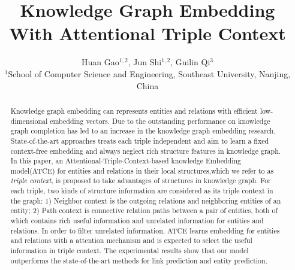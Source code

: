 \documentclass{article}
\title{Knowledge Graph Embedding With Attentional Triple Context}
\author{Huan Gao$^{1,2}$, Jun Shi$^{1,2}$, Guilin Qi$^{3}$\\
$^{1}$School of Computer Science and Engineering,
Southeast University, Nanjing, China  \\
}
\begin{document}
\maketitle

\begin{abstract}
    Knowledge graph embedding can represents entities and relations with efficient low-dimensional embedding vectors. Due to the outstanding performance on knowledge graph completion has led to an increase in the knowledge graph embedding research. State-of-the-art approaches treats each triple independent and aim to learn a fixed context-free embedding and always neglect rich structure features in knowledge graph. In this paper, an Attentional-Triple-Context-based knowledge Embedding model(ATCE) for entities and relations in their local structures,which we refer to as \emph{triple context}, is proposed to take advantages of structures in knowledge graph. For each triple, two kinds of structure information are considered as its triple context in the graph: 1) Neighbor context is the outgoing relations and neighboring entities of an entity; 2) Path context is connective relation paths between a pair of entities, both of which contains rich useful information and unrelated information for entities and relations. In order to filter unrelated information, ATCE learns embedding for entities and relations with a attention mechanism and is expected to select the useful information in triple context. The experimental results show that our model outperforms the state-of-the-art methods for link prediction and entity prediction.
\end{abstract}












%

\end{document}
